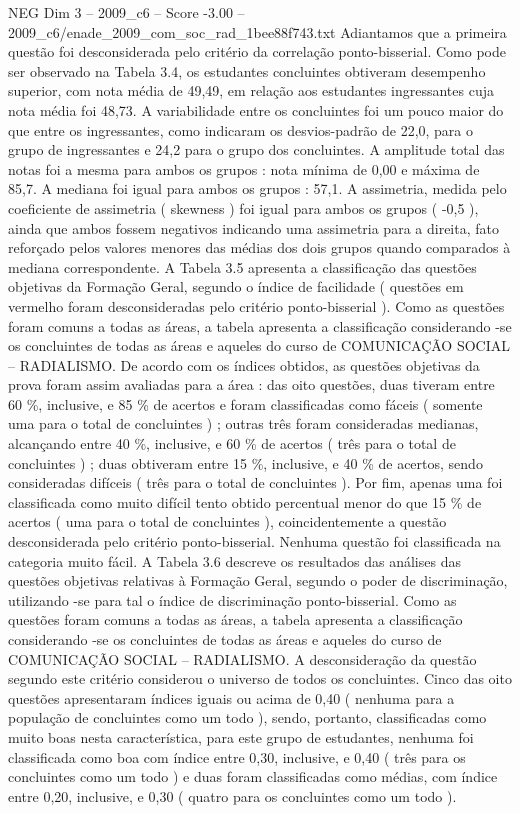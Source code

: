 \begin{textsample}{NEG Dim 3 – 2009\_c6 – Score -3.00 – 2009\_c6/enade\_2009\_com\_soc\_rad\_1bee88f743.txt}
Adiantamos que a primeira questão foi desconsiderada pelo critério da correlação ponto-bisserial.
Como pode ser observado na Tabela 3.4, os estudantes concluintes obtiveram desempenho superior, com nota média de 49,49, em relação aos estudantes ingressantes cuja nota média foi 48,73.
A variabilidade entre os concluintes foi um pouco maior do que entre os ingressantes, como indicaram os desvios-padrão de 22,0, para o grupo de ingressantes e 24,2 para o grupo dos concluintes.
A amplitude total das notas foi a mesma para ambos os grupos : nota mínima de 0,00 e máxima de 85,7.
A mediana foi igual para ambos os grupos : 57,1.
A assimetria, medida pelo coeficiente de assimetria ( skewness ) foi igual para ambos os grupos ( -0,5 ), ainda que ambos fossem negativos indicando uma assimetria para a direita, fato reforçado pelos valores menores das médias dos dois grupos quando comparados à mediana correspondente.
A Tabela 3.5 apresenta a classificação das questões objetivas da Formação Geral, segundo o índice de facilidade ( questões em vermelho foram desconsideradas pelo critério ponto-bisserial ).
Como as questões foram comuns a todas as áreas, a tabela apresenta a classificação considerando -se os concluintes de todas as áreas e aqueles do curso de COMUNICAÇÃO SOCIAL – RADIALISMO.
De acordo com os índices obtidos, as questões objetivas da prova foram assim avaliadas para a área : das oito questões, duas tiveram entre 60 \%, inclusive, e 85 \% de acertos e foram classificadas como fáceis ( somente uma para o total de concluintes ) ; outras três foram consideradas medianas, alcançando entre 40 \%, inclusive, e 60 \% de acertos ( três para o total de concluintes ) ; duas obtiveram entre 15 \%, inclusive, e 40 \% de acertos, sendo consideradas difíceis ( três para o total de concluintes ).
Por fim, apenas uma foi classificada como muito difícil tento obtido percentual menor do que 15 \% de acertos ( uma para o total de concluintes ), coincidentemente a questão desconsiderada pelo critério ponto-bisserial.
Nenhuma questão foi classificada na categoria muito fácil.
A Tabela 3.6 descreve os resultados das análises das questões objetivas relativas à Formação Geral, segundo o poder de discriminação, utilizando -se para tal o índice de discriminação ponto-bisserial.
Como as questões foram comuns a todas as áreas, a tabela apresenta a classificação considerando -se os concluintes de todas as áreas e aqueles do curso de COMUNICAÇÃO SOCIAL – RADIALISMO.
A desconsideração da questão segundo este critério considerou o universo de todos os concluintes.
Cinco das oito questões apresentaram índices iguais ou acima de 0,40 ( nenhuma para a população de concluintes como um todo ), sendo, portanto, classificadas como muito boas nesta característica, para este grupo de estudantes, nenhuma foi classificada como boa com índice entre 0,30, inclusive, e 0,40 ( três para os concluintes como um todo ) e duas foram classificadas como médias, com índice entre 0,20, inclusive, e 0,30 ( quatro para os concluintes como um todo ).

\end{textsample}

